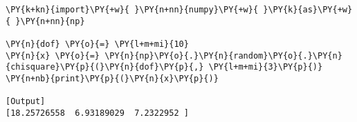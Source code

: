 \begin{Verbatim}[label=\makebox{\href{https://github.com/unipi-physics-labs/statnotes/tree/main/snippy/np.random.chisquare.py}{https://github.com/.../np.random.chisquare.py}},commandchars=\\\{\}]
\PY{k+kn}{import}\PY{+w}{ }\PY{n+nn}{numpy}\PY{+w}{ }\PY{k}{as}\PY{+w}{ }\PY{n+nn}{np}

\PY{n}{dof} \PY{o}{=} \PY{l+m+mi}{10}
\PY{n}{x} \PY{o}{=} \PY{n}{np}\PY{o}{.}\PY{n}{random}\PY{o}{.}\PY{n}{chisquare}\PY{p}{(}\PY{n}{dof}\PY{p}{,} \PY{l+m+mi}{3}\PY{p}{)}
\PY{n+nb}{print}\PY{p}{(}\PY{n}{x}\PY{p}{)}

[Output]
[18.25726558  6.93189029  7.2322952 ]
\end{Verbatim}
